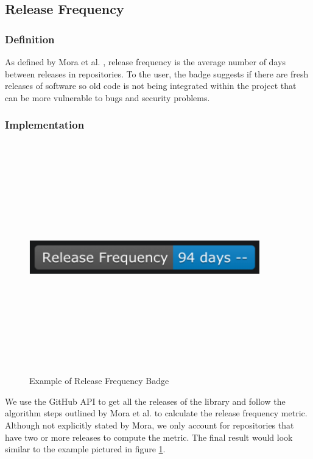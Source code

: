 \documentclass[12pt, letterpaper]{article}
\begin{document}
\subsection{Release Frequency}
\subsubsection{Definition}
As defined by Mora et al. \cite{metrics}, release frequency is the average number of days between
releases in repositories. 
To the user, the badge suggests if there are fresh releases of software so old code is not being 
integrated within the 
project that can be more vulnerable to bugs and security problems.

\subsubsection{Implementation}

\begin{figure}[!htb]
    \centerline{
        \includegraphics[width=10cm,height=10cm,keepaspectratio=true]{releasebadge}
    }
    \caption{
        Example of Release Frequency Badge
    }
    \label{releasebadge}
\end{figure}

We use the GitHub \cite{github} API to get all the releases of the library and follow the algorithm
steps outlined by Mora et al. \cite{metrics} to calculate the release frequency metric.
Although not explicitly stated by Mora, we only account for repositories that have two or more releases to compute
the metric. The final result would look similar to the example pictured in figure \ref{releasebadge}.
\end{document}
